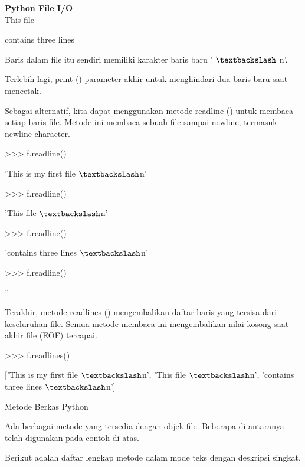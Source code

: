 \begin{center}{\fontsize{24pt}{24pt}\selectfont \textbf{Python File I/O} \\}
This file 

contains three lines 
\vspace{12pt}
\vspace{12pt}
 
Baris dalam file itu sendiri memiliki karakter baris baru ' $  \textbackslash  $ n'. 
\vspace{12pt}

Terlebih lagi, print () parameter akhir untuk menghindari dua baris baru saat mencetak. 
\vspace{12pt}
 
Sebagai alternatif, kita dapat menggunakan metode readline () untuk membaca setiap baris file. Metode ini membaca sebuah file sampai newline, termasuk newline character. 
\vspace{12pt}

>>> f.readline() 

'This is my first file $  \textbackslash  $n' 
\vspace{12pt}

>>> f.readline() 

'This file $  \textbackslash  $n' 
\vspace{12pt}

>>> f.readline() 

'contains three lines $  \textbackslash  $n' 
\vspace{12pt}

>>> f.readline() 

'' 
\vspace{16pt}
 
Terakhir, metode readlines () mengembalikan daftar baris yang tersisa dari keseluruhan file. Semua metode membaca ini mengembalikan nilai kosong saat akhir file (EOF) tercapai. 
\vspace{12pt}

>>> f.readlines() 

['This is my first file $  \textbackslash  $n', 'This file $  \textbackslash  $n', 'contains three lines $  \textbackslash  $n'] 

\vspace{12pt}
\vspace{12pt}

Metode Berkas Python 
\vspace{12pt}
 
Ada berbagai metode yang tersedia dengan objek file. Beberapa di antaranya telah digunakan pada contoh di atas. 
\vspace{12pt}
 
Berikut adalah daftar lengkap metode dalam mode teks dengan deskripsi singkat. 
\vspace{12pt}


\end{center}
